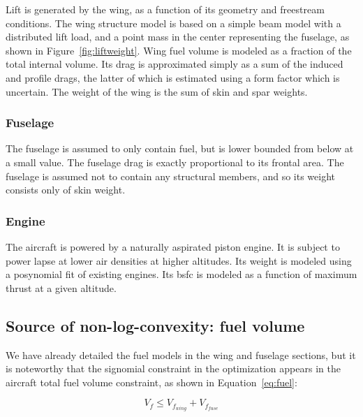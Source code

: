 Lift is generated by the wing, as a function of its geometry and freestream conditions.
The wing structure model is based on a simple beam model with a distributed lift load,
and a point mass in the center representing the fuselage, as shown in Figure~\ref{fig:liftweight}.
Wing fuel volume is modeled as a fraction of the total internal volume. Its drag is
approximated simply as a sum of the induced and profile drags, the latter of which is estimated using a
form factor which is uncertain. The weight of the wing is the sum of skin and spar weights.

\subsubsection{Fuselage}

The fuselage is assumed to only contain fuel, but is lower bounded from below at a small value.
The fuselage drag is exactly proportional to its frontal area.
The fuselage is assumed not to contain any structural members, and so its weight consists only of skin weight.

\subsubsection{Engine}

The aircraft is powered by a naturally aspirated piston engine. It is subject to
power lapse at lower air densities at higher altitudes. Its weight is modeled using a posynomial fit of existing
engines. Its \gls{bsfc} is modeled as a function of maximum thrust at a given altitude.

\subsection{Source of non-log-convexity: fuel volume}
We have already detailed the fuel models in the wing and fuselage sections, but it is noteworthy that
the signomial constraint in the optimization appears in the aircraft total fuel volume constraint,
as shown in Equation~\ref{eq:fuel}:

\begin{equation}
\label{eq:fuel}
V_f \leq V_{f_{wing}} + V_{f_{fuse}} 
\end{equation}
